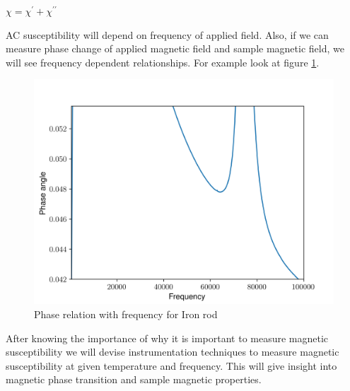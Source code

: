 $\chi= \chi^\prime +\chi^{\prime\prime}$

AC susceptibility will depend on frequency of applied field. Also, if we can measure phase change of applied magnetic field and sample magnetic field, we will see frequency dependent relationships. For example look at figure \ref{fig:phaserel}.

\begin{figure}
\includegraphics[width=\linewidth]{phaserel.png}
\caption{Phase relation with frequency for Iron rod}
\label{fig:phaserel}
\end{figure}

After knowing the importance of why it is important to measure magnetic susceptibility we will devise instrumentation techniques to measure magnetic susceptibility at given temperature and frequency. This will give insight into magnetic phase transition and sample magnetic properties.



